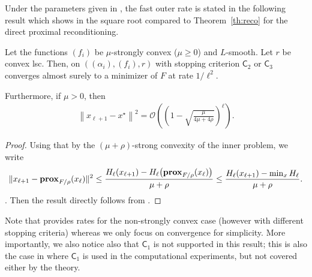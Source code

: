 Under the parameters given in \cite{lin2017catalyst}, the fast outer rate is stated in the following result which shows in the square root compared to Theorem~\ref{th:reco} for the direct proximal reconditioning.

\begin{theorem}
\label{thm:cata}
Let the functions $(f_i)$ be $\mu$-strongly convex ($\mu\geq0$) and $L$-smooth. Let $r$ be convex lsc. 
Then, \cataalgo on $((\alpha_i),(f_i),r)$ with stopping criterion $\mathsf{C}_2$ or $\mathsf{C}_3$  converges almost surely to a minimizer of $F$ at rate $1/\ell^2$.

Furthermore, if $\mu>0$, then 
      \begin{align}
      \left\|x_{\ell+1} - x^\star  \right\|^2  ={\mathcal{O}} \left( \left(   1 - \sqrt{ \frac{{\mu }}{4\mu + 4{\rho }} }  \right)^\ell \right) .
        \end{align}
\end{theorem}

\begin{proof}
    Using that by the $(\mu+\rho)$-strong convexity of the inner problem, we write
    $$ \|x_{\ell+1} -  \mathbf{prox}_{F/\rho}(x_\ell)\|^2 \leq \frac{H_\ell(x_{\ell+1}) - H_\ell\big(\mathbf{prox}_{F/\rho}(x_\ell)\big)}{\mu+\rho}
    \leq \frac{H_\ell(x_{\ell+1}) - \min_x  H_\ell}{\mu+\rho}. $$.
    Then the result directly follows from \cite{lin2017catalyst}.
\end{proof}

Note that \cite{lin2017catalyst} provides rates for the non-strongly convex case (however with different stopping criteria) whereas we only focus on convergence for simplicity. 
More importantly, we also notice also that $\mathsf{C}_1$ is not supported in this result; this is also the case in \cite{lin2017catalyst} where $\mathsf{C}_1$ is used in the computational experiments, but not covered either by the theory.


